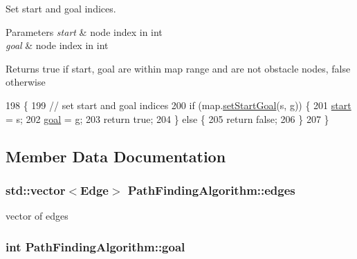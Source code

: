 Set start and goal indices. 


\begin{DoxyParams}{Parameters}
{\em start} & node index in int \\
\hline
{\em goal} & node index in int \\
\hline
\end{DoxyParams}
\begin{DoxyReturn}{Returns}
true if start, goal are within map range and are not obstacle nodes, false otherwise 
\end{DoxyReturn}

\begin{DoxyCode}
198                                                 \{
199     \textcolor{comment}{// set start and goal indices}
200     \textcolor{keywordflow}{if} (map.\hyperlink{classMap_aa64162f950a1936e1eaf42609e091524}{setStartGoal}(s, g)) \{
201         \hyperlink{classPathFindingAlgorithm_a1c31bd6b8c57459c32ada19cf9bf412a}{start} = s;
202         \hyperlink{classPathFindingAlgorithm_ae8acf41f92ba72a969a44640c99fb8a4}{goal} = g;
203         \textcolor{keywordflow}{return} \textcolor{keyword}{true};
204     \} \textcolor{keywordflow}{else} \{
205         \textcolor{keywordflow}{return} \textcolor{keyword}{false};
206     \}
207 \}
\end{DoxyCode}


\subsection{Member Data Documentation}
\hypertarget{classPathFindingAlgorithm_ae535e0897714e84f5ab40d5dc5d654ec}{
\subsubsection[{edges}]{\setlength{\rightskip}{0pt plus 5cm}std\-::vector$<${\bf Edge}$>$ Path\-Finding\-Algorithm\-::edges\hspace{0.3cm}{\ttfamily [protected]}}}\label{classPathFindingAlgorithm_ae535e0897714e84f5ab40d5dc5d654ec}


vector of edges 

\hypertarget{classPathFindingAlgorithm_ae8acf41f92ba72a969a44640c99fb8a4}{
\subsubsection[{goal}]{\setlength{\rightskip}{0pt plus 5cm}int Path\-Finding\-Algorithm\-::goal\hspace{0.3cm}{\ttfamily [protected]}}}\label{classPathFindingAlgorithm_ae8acf41f92ba72a969a44640c99fb8a4}


